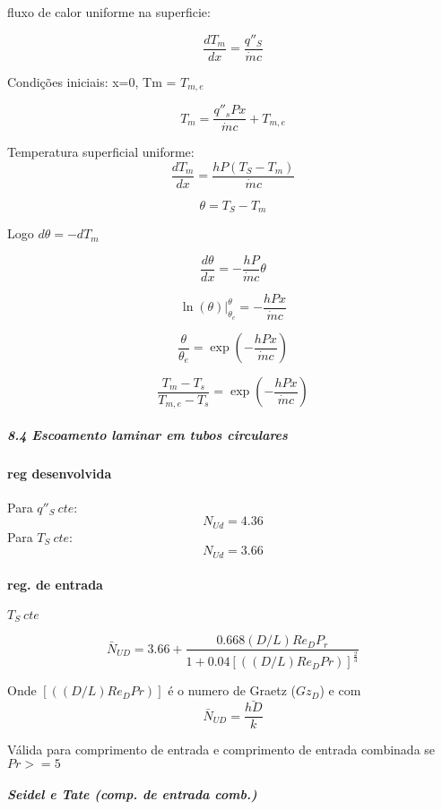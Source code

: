 fluxo de calor uniforme na superficie:

\[\frac{dT_{m}}{dx}= \frac{q''_{S}}{\dot{m}c}\]

Condições iniciais: x=0, Tm = $T_{m,e}$

\[T_{m}= \frac{q''_{s}Px}{\dot{m}c}+T_{m,e}\]



Temperatura superficial uniforme:
\[ \frac{dT_{m}}{dx} = \frac{hP(T_{S}-T_{m})}{\dot{m}c}\]

\[\theta=T_{S}-T_{m} \]

Logo $d \theta = -dT_{m}$

\[\frac{d\theta}{dx}=-\frac{hP}{\dot{m}c}\theta\]

\[\ln (\theta)|_{\theta_{e}}^{\theta}= - \frac{hPx}{\dot{m}c}\]

\[\frac{\theta}{\theta_{e}}= \exp (- \frac{hPx}{\dot{m}c})\]

\[\frac{T_{m}-T_{s}}{T_{m,e}-T_{s}}= \exp (- \frac{hPx}{\dot{m}c})\]

\subparagraph*{8.4 Escoamento laminar em tubos circulares}

\paragraph*{reg desenvolvida}

Para $q''_{S}\ cte$: 
\[N_{Ud}=4.36\]
Para $T_{S}\ cte$: 
\[N_{Ud}=3.66\]

\paragraph*{reg. de entrada}

$T_{S}\ cte$

\[\bar{N}_{UD}=3.66+\frac{0.668(D/L)Re_{D}P_{r}}{1+0.04[((D/L)Re_{D}Pr)]^{\frac{2}{3}}}\]

Onde $[((D/L)Re_{D}Pr)]$ é o numero de Graetz ($Gz_{D}$) e com 
\[\bar{N}_{UD}=\frac{\bar{hD}}{k} \]

Válida para comprimento de entrada e comprimento de entrada combinada se $Pr >=5$

\subparagraph*{Seidel e Tate (comp. de entrada comb.)}

